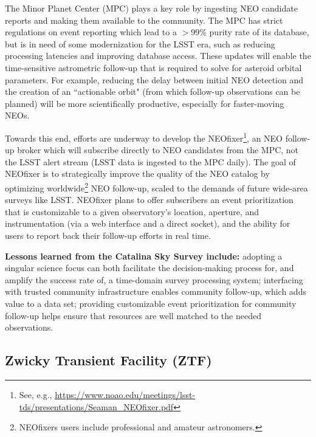 The Minor Planet Center (MPC) plays a key role by ingesting NEO candidate reports and making them available to the community.
The MPC has strict regulations on event reporting which lead to a $>$99\% purity rate of its database, but is in need of some modernization for the LSST era, such as reducing processing latencies and improving database access.
These updates will enable the time-sensitive astrometric follow-up that is required to solve for asteroid orbital parameters.
For example, reducing the delay between initial NEO detection and the creation of an ``actionable orbit" (from which follow-up observations can be planned) will be more scientifically productive, especially for faster-moving NEOs.

Towards this end, efforts are underway to develop the NEOfixer\footnote{See, e.g., \url{https://www.noao.edu/meetings/lsst-tds/presentations/Seaman_NEOfixer.pdf}}, an NEO follow-up broker which will subscribe directly to NEO candidates from the MPC, not the LSST alert stream (LSST data is ingested to the MPC daily).
The goal of NEOfixer is to strategically improve the quality of the NEO catalog by optimizing worldwide\footnote{NEOfixers users include professional and amateur astronomers.} NEO follow-up, scaled to the demands of future wide-area surveys like LSST.
NEOfixer plans to offer subscribers an event prioritization that is customizable to a given observatory's location, aperture, and instrumentation (via a web interface and a direct socket), and the ability for users to report back their follow-up efforts in real time.

{\bf Lessons learned from the Catalina Sky Survey include:}
adopting a singular science focus can both facilitate the decision-making process for, and amplify the success rate of, a time-domain survey processing system;
interfacing with trusted community infrastructure enables community follow-up, which adds value to a data set;
providing customizable event prioritization for community follow-up helps ensure that resources are well matched to the needed observations.


\subsection{Zwicky Transient Facility (ZTF)}

